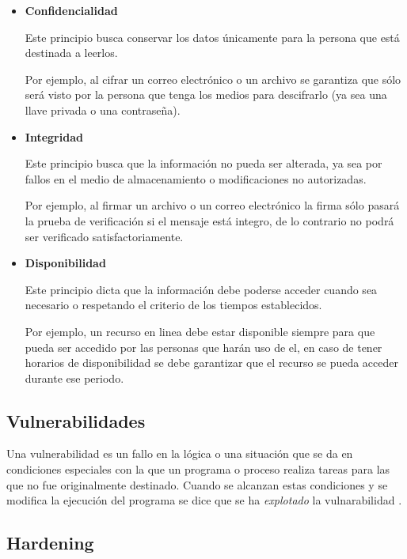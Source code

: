 \begin{itemize}

  \item \textbf{Confidencialidad}

Este principio busca conservar los datos \'{u}nicamente para la persona que est\'{a} destinada a leerlos.

Por ejemplo, al cifrar un correo electr\'{o}nico o un archivo se garantiza que s\'{o}lo ser\'{a} visto por la persona que tenga los medios para descifrarlo (ya sea una llave privada o una contrase\~{n}a).

  \item \textbf{Integridad}

Este principio busca que la informaci\'{o}n no pueda ser alterada, ya sea por fallos en el medio de almacenamiento o modificaciones no autorizadas.

Por ejemplo, al firmar un archivo o un correo electr\'{o}nico la firma s\'{o}lo pasar\'{a} la prueba de verificaci\'{o}n si el mensaje est\'{a} integro, de lo contrario no podr\'{a} ser verificado satisfactoriamente.

  \item \textbf{Disponibilidad}

Este principio dicta que la informaci\'{o}n debe poderse acceder cuando sea necesario o respetando el criterio de los tiempos establecidos.

Por ejemplo, un recurso en linea debe estar disponible siempre para que pueda ser accedido por las personas que har\'{a}n uso de el, en caso de tener horarios de disponibilidad se debe garantizar que el recurso se pueda acceder durante ese periodo.

\end{itemize}

  \subsection {Vulnerabilidades}

Una vulnerabilidad es un fallo en la l\'{o}gica o una situaci\'{o}n que se da en condiciones especiales con la que un programa o proceso realiza tareas para las que no fue originalmente destinado. Cuando se alcanzan estas condiciones y se modifica la ejecuci\'{o}n del programa se dice que se ha \textit{explotado} la vulnarabilidad \cite{padilla_buenas_2009}.

  \subsection {Hardening}

